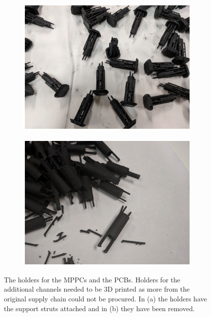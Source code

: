 \begin{figure}[!h]
\centering
\begin{subfigure}{.5\textwidth}
  \centering
  \includegraphics[width=\linewidth]{Chapter3/Figs/Raster/detCon015b_3dPrintedHolders.png}
  \captionsetup{width=.9\linewidth}
  \caption{}
  \label{subFig:detCon015b_3dPrintedHolders}
\end{subfigure}%
\begin{subfigure}{.5\textwidth}
  \centering
  \includegraphics[width=\linewidth]{Chapter3/Figs/Raster/detCon016b_3dPrintedFreed.png}
  \captionsetup{width=.9\linewidth}
  \caption{}
  \label{subFig:detCon016b_3dPrintedFreed}
\end{subfigure}
\caption{The holders for the MPPCs and the PCBs. Holders for the additional channels needed to be 3D printed as more from the original supply chain could not be procured. In (a) the holders have the support struts attached and in (b) they have been removed.}
\label{fig:detCon_3dPrintedHolders_3dPrintedFreed}
\end{figure}

